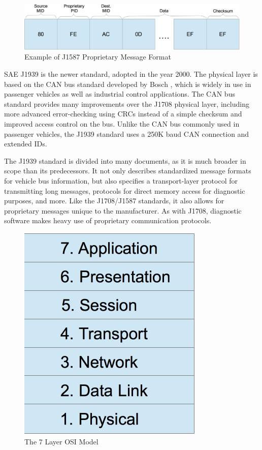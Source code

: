 \begin{figure}[h]
  \centering
  \includegraphics[scale=0.6]{J1708Proprietary}
  \caption{Example of J1587 Proprietary Message Format}
  \label{fig:j1587-proprietary}
\end{figure}


SAE J1939 \cite{J1939-71} is the newer standard, adopted in the year 2000. The physical layer is based on the CAN bus standard developed by Bosch \cite{Bosch1991}, which is widely in use
in passenger vehicles as well as industrial control applications. The CAN bus standard provides many improvements over the J1708 physical layer,
including more advanced error-checking using CRCs instead of a simple checksum and improved access control on the bus. Unlike the CAN bus commonly used in
passenger vehicles, the J1939 standard uses a 250K baud CAN connection and extended IDs.

The J1939 standard is divided into many documents, as it is much broader in scope than its predecessors. It not only describes standardized
message formats for vehicle bus information, but also specifies a transport-layer protocol for transmitting long messages, protocols for
direct memory access for diagnostic purposes, and more. Like the J1708/J1587 standards, it also allows for proprietary messages unique
to the manufacturer. As with J1708, diagnostic software makes heavy use of proprietary communication protocols.

\begin{figure}[h]
  \centering
  \includegraphics[scale=.75]{OSIModel}
  \caption{The 7 Layer OSI Model \cite{Day1983}}
  \label{fig:osimodel}
\end{figure}

